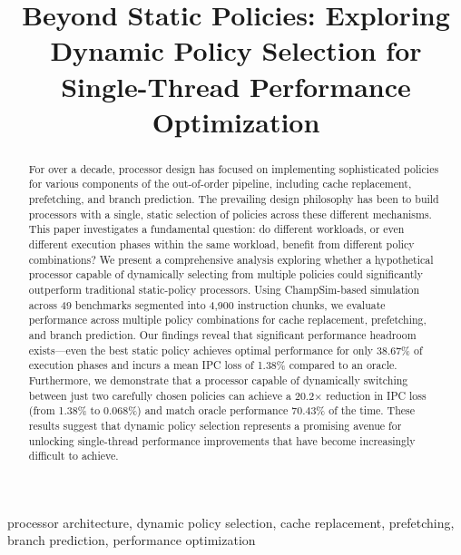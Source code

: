 \documentclass[conference]{IEEEtran}
\begin{document}
\title{Beyond Static Policies: Exploring Dynamic Policy Selection for Single-Thread Performance Optimization}

\author{
}

\maketitle

\begin{abstract}
For over a decade, processor design has focused on implementing sophisticated policies for various components of the out-of-order pipeline, including cache replacement, prefetching, and branch prediction. The prevailing design philosophy has been to build processors with a single, static selection of policies across these different mechanisms. This paper investigates a fundamental question: do different workloads, or even different execution phases within the same workload, benefit from different policy combinations? We present a comprehensive analysis exploring whether a hypothetical processor capable of dynamically selecting from multiple policies could significantly outperform traditional static-policy processors. Using ChampSim-based simulation across 49 benchmarks segmented into 4,900 instruction chunks, we evaluate performance across multiple policy combinations for cache replacement, prefetching, and branch prediction. Our findings reveal that significant performance headroom exists---even the best static policy achieves optimal performance for only 38.67\% of execution phases and incurs a mean IPC loss of 1.38\% compared to an oracle. Furthermore, we demonstrate that a processor capable of dynamically switching between just two carefully chosen policies can achieve a 20.2$\times$ reduction in IPC loss (from 1.38\% to 0.068\%) and match oracle performance 70.43\% of the time. These results suggest that dynamic policy selection represents a promising avenue for unlocking single-thread performance improvements that have become increasingly difficult to achieve.
\end{abstract}

\begin{IEEEkeywords}
processor architecture, dynamic policy selection, cache replacement, prefetching, branch prediction, performance optimization
\end{IEEEkeywords}
\end{document}
